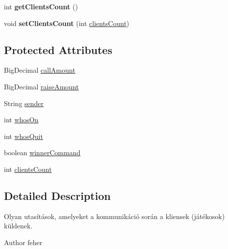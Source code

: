 \begin{DoxyCompactItemize}
\item 
\hypertarget{classhu_1_1elte_1_1bfw1p6_1_1poker_1_1command_1_1_player_command_ad94f70630ba81824965afcdb8bb28b7f}{}int {\bfseries get\+Clients\+Count} ()\label{classhu_1_1elte_1_1bfw1p6_1_1poker_1_1command_1_1_player_command_ad94f70630ba81824965afcdb8bb28b7f}

\item 
\hypertarget{classhu_1_1elte_1_1bfw1p6_1_1poker_1_1command_1_1_player_command_a9f955f9b293aa0085c1c5fae60e24375}{}void {\bfseries set\+Clients\+Count} (int \hyperlink{classhu_1_1elte_1_1bfw1p6_1_1poker_1_1command_1_1_player_command_a9a8c6f3395c3075a2cf4fd3e1a8cd61f}{clients\+Count})\label{classhu_1_1elte_1_1bfw1p6_1_1poker_1_1command_1_1_player_command_a9f955f9b293aa0085c1c5fae60e24375}

\end{DoxyCompactItemize}
\subsection*{Protected Attributes}
\begin{DoxyCompactItemize}
\item 
Big\+Decimal \hyperlink{classhu_1_1elte_1_1bfw1p6_1_1poker_1_1command_1_1_player_command_a6ccfc341bcd13c5dd21e8c9d00402f17}{call\+Amount}
\item 
Big\+Decimal \hyperlink{classhu_1_1elte_1_1bfw1p6_1_1poker_1_1command_1_1_player_command_a188c92b4508db681e74d8cf84cd6b2b8}{raise\+Amount}
\item 
String \hyperlink{classhu_1_1elte_1_1bfw1p6_1_1poker_1_1command_1_1_player_command_aadab45496b9dd59dc734f14e574db2ca}{sender}
\item 
int \hyperlink{classhu_1_1elte_1_1bfw1p6_1_1poker_1_1command_1_1_player_command_a4ce9722b75511026a274d944012d8a0a}{whos\+On}
\item 
int \hyperlink{classhu_1_1elte_1_1bfw1p6_1_1poker_1_1command_1_1_player_command_a43819862610cf28b8d411d99b3ae2810}{whos\+Quit}
\item 
boolean \hyperlink{classhu_1_1elte_1_1bfw1p6_1_1poker_1_1command_1_1_player_command_ab3043640310f87b9e7325a9e60b06c9a}{winner\+Command}
\item 
int \hyperlink{classhu_1_1elte_1_1bfw1p6_1_1poker_1_1command_1_1_player_command_a9a8c6f3395c3075a2cf4fd3e1a8cd61f}{clients\+Count}
\end{DoxyCompactItemize}


\subsection{Detailed Description}
Olyan utasítások, amelyeket a kommunikáció során a kliensek (játékosok) küldenek. \begin{DoxyAuthor}{Author}
feher 
\end{DoxyAuthor}


